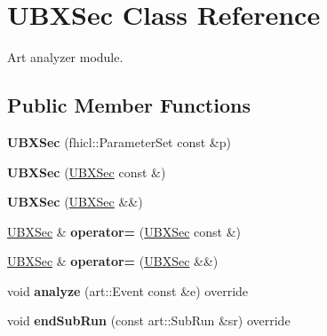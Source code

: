 \hypertarget{classUBXSec}{\section{\-U\-B\-X\-Sec \-Class \-Reference}
\label{classUBXSec}
}


\-Art analyzer module.  


\subsection*{\-Public \-Member \-Functions}
\begin{DoxyCompactItemize}
\item 
\hypertarget{classUBXSec_a002d19d94378dc90587c10bd4b498c4b}{{\bfseries \-U\-B\-X\-Sec} (fhicl\-::\-Parameter\-Set const \&p)}\label{classUBXSec_a002d19d94378dc90587c10bd4b498c4b}

\item 
\hypertarget{classUBXSec_addfe39c7f3bf37d69254df5e87a9508b}{{\bfseries \-U\-B\-X\-Sec} (\hyperlink{classUBXSec}{\-U\-B\-X\-Sec} const \&)}\label{classUBXSec_addfe39c7f3bf37d69254df5e87a9508b}

\item 
\hypertarget{classUBXSec_a82ac81ae3bb5afe3f414449ad1cfa7ce}{{\bfseries \-U\-B\-X\-Sec} (\hyperlink{classUBXSec}{\-U\-B\-X\-Sec} \&\&)}\label{classUBXSec_a82ac81ae3bb5afe3f414449ad1cfa7ce}

\item 
\hypertarget{classUBXSec_a2fd957f5a0697d933bd55bfbc17fee46}{\hyperlink{classUBXSec}{\-U\-B\-X\-Sec} \& {\bfseries operator=} (\hyperlink{classUBXSec}{\-U\-B\-X\-Sec} const \&)}\label{classUBXSec_a2fd957f5a0697d933bd55bfbc17fee46}

\item 
\hypertarget{classUBXSec_a1034e664c80f3fbd3eea29d209f58196}{\hyperlink{classUBXSec}{\-U\-B\-X\-Sec} \& {\bfseries operator=} (\hyperlink{classUBXSec}{\-U\-B\-X\-Sec} \&\&)}\label{classUBXSec_a1034e664c80f3fbd3eea29d209f58196}

\item 
\hypertarget{classUBXSec_a30a2981a63a32be7d7b8819bb462e859}{void {\bfseries analyze} (art\-::\-Event const \&e) override}\label{classUBXSec_a30a2981a63a32be7d7b8819bb462e859}

\item 
\hypertarget{classUBXSec_a7cc3686ca5cb1a620bf8b5bba0987bf9}{void {\bfseries end\-Sub\-Run} (const art\-::\-Sub\-Run \&sr) override}\label{classUBXSec_a7cc3686ca5cb1a620bf8b5bba0987bf9}

\end{DoxyCompactItemize}


